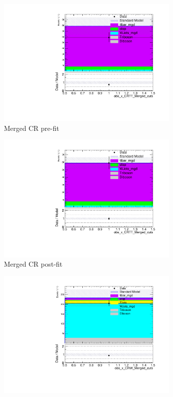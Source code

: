 \begin{figure}[h]
\begin{subfigure}{0.49\textwidth}
     \includegraphics[width = 0.98\textwidth]{Figures/5/bkg_only/CRTT_Merged_cuts_beforeFit.pdf}
     \caption{Merged CR \ttbar pre-fit}
     \end{subfigure}
     \begin{subfigure}{0.49\textwidth}
     \includegraphics[width = 0.98\textwidth]{Figures/5/bkg_only/CRTT_Merged_cuts_afterFit.pdf}
     \caption{Merged CR \ttbar post-fit}
     \end{subfigure}
     \begin{subfigure}{0.49\textwidth}
     \includegraphics[width = 0.98\textwidth]{Figures/5/bkg_only/CRW_Merged_cuts_beforeFit.pdf}

\end{subfigure}
\end{figure}
